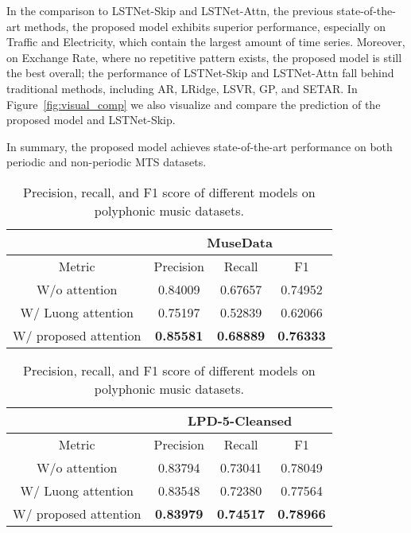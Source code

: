 In the comparison to LSTNet-Skip and LSTNet-Attn, the previous state-of-the-art methods, the proposed model exhibits superior performance, especially on Traffic and Electricity, which contain the largest amount of time series.
Moreover, on Exchange Rate, where no repetitive pattern exists, the proposed model is still the best overall; the performance of LSTNet-Skip and LSTNet-Attn fall behind traditional methods, including AR, LRidge, LSVR, GP, and SETAR.
In Figure~\ref{fig:visual_comp} we also visualize and compare the prediction of the proposed model and LSTNet-Skip.

In summary, the proposed model achieves state-of-the-art performance on both periodic and non-periodic MTS datasets.

\begin{table}
    \footnotesize
    \centering
    \begin{tabular}{|c||c|c|c|}
    \hline
                          & \multicolumn{3}{c|}{MuseData}                          \\
    \hline
    Metric                & Precision        & Recall           & F1               \\
    \hline
    \hline
    W/o attention         & 0.84009          & 0.67657          & 0.74952          \\
    \hline
    W/ Luong attention    & 0.75197          & 0.52839          & 0.62066          \\
    \hline
    W/ proposed attention & \textbf{0.85581} & \textbf{0.68889} & \textbf{0.76333} \\
    \hline
    \end{tabular}
    
    \vspace{5pt}
    
    \begin{tabular}{|c||c|c|c|}
    \hline
                          & \multicolumn{3}{c|}{LPD-5-Cleansed}                    \\
    \hline
    Metric                & Precision        & Recall           & F1               \\
    \hline
    \hline
    W/o attention         & 0.83794          & 0.73041          & 0.78049          \\
    \hline
    W/ Luong attention    & 0.83548          & 0.72380          & 0.77564          \\
    \hline
    W/ proposed attention & \textbf{0.83979} & \textbf{0.74517} & \textbf{0.78966} \\
    \hline
    \end{tabular}
    \caption{Precision, recall, and F1 score of different models on polyphonic music datasets.}
    \label{tab:music}
\end{table}

